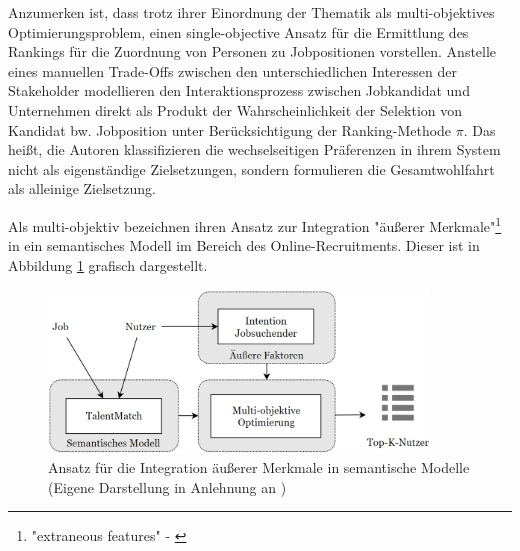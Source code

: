 Anzumerken ist, dass \textcite[S. 328ff.]{su:inproceedings} trotz ihrer Einordnung der Thematik als multi-objektives Optimierungsproblem, einen single-objective Ansatz für die Ermittlung des Rankings für die Zuordnung von Personen zu Jobpositionen vorstellen.
Anstelle eines manuellen Trade-Offs zwischen den unterschiedlichen Interessen der Stakeholder modellieren \textcite[S. 329]{su:inproceedings} den Interaktionsprozess zwischen Jobkandidat und Unternehmen direkt als Produkt der Wahrscheinlichkeit der Selektion von Kandidat bw. Jobposition unter Berücksichtigung der Ranking-Methode $\pi$.
Das heißt, die Autoren klassifizieren die wechselseitigen Präferenzen in ihrem System nicht als eigenständige Zielsetzungen, sondern formulieren die Gesamtwohlfahrt als alleinige Zielsetzung.

Als multi-objektiv bezeichnen \textcite[S. 12]{rodriguez:inproceedings} ihren Ansatz zur Integration "äußerer Merkmale"\footnote{"extraneous features" - \textcite[S. 12]{rodriguez:inproceedings}} in ein semantisches Modell im Bereich des Online-Recruitments. 
Dieser ist in Abbildung \ref{fig:relatedwork:abb1} grafisch dargestellt.

\begin{figure}[H]
    \centering
	\includegraphics[width=0.9\textwidth]{gfx/talentMatch.png}
	\caption[Ansatz für die Integration äußerer Merkmale in semantische Modelle]{Ansatz für die Integration äußerer Merkmale in semantische Modelle\\
    (Eigene Darstellung in Anlehnung an \cite[S. 12]{rodriguez:inproceedings})}
	\label{fig:relatedwork:abb1}
\end{figure}

